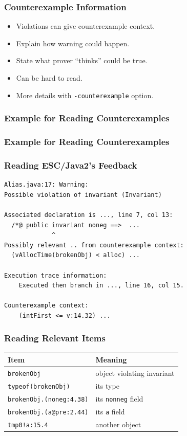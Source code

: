 \begin{frame}
\frametitle{Counterexample Information}
\begin{itemize}
\item
Violations can give counterexample context.

\item
Explain how warning could happen.

\item
State what prover ``thinks'' could be true.

\item
Can be hard to read.

\item
More details with \texttt{-counterexample} option.
\end{itemize}
\end{frame}

\begin{frame}[fragile]
\frametitle{Example for Reading Counterexamples}
\begin{example}

\end{example}
\end{frame}

\begin{frame}[fragile]
\frametitle{Example for Reading Counterexamples}
\begin{example}

\end{example}
\end{frame}

\begin{frame}[fragile]
\frametitle{Reading ESC/Java2's Feedback}
\begin{verbatim}
Alias.java:17: Warning: 
Possible violation of invariant (Invariant)

Associated declaration is ..., line 7, col 13:
  /*@ public invariant noneg ==>  ...
             ^
Possibly relevant .. from counterexample context:  
  (vAllocTime(brokenObj) < alloc) ...

Execution trace information:
    Executed then branch in ..., line 16, col 15.

Counterexample context:
    (intFirst <= v:14.32) ...
\end{verbatim}
\end{frame}

\begin{frame}
\frametitle{Reading Relevant Items}
\begin{tabular}{ll}
Item & Meaning \\
\hline
\texttt{brokenObj} & object violating invariant \\
\texttt{typeof(brokenObj)} & its type \\
\texttt{brokenObj.(noneg:4.38)} & its \texttt{nonneg} field \\
\texttt{brokenObj.(a@pre:2.44)} & its \texttt{a} field \\
\texttt{tmp0!a:15.4} & another object
\end{tabular}
\end{frame}

